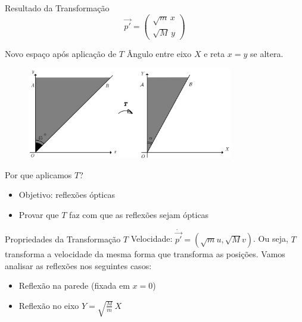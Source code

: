 \documentclass{beamer}
\begin{document}
\begin{frame}{Resultado da Transformação}
  \begin{equation*}
    \vec{p'}=\begin{pmatrix}\sqrt m\,x\\\sqrt M\,y\end{pmatrix}
  \end{equation*}
\end{frame}

\begin{frame}{Novo espaço após aplicação de $T$}
  Ângulo entre eixo $X$ e reta $x=y$ se altera.
  \begin{figure}
    \centering
    \includegraphics[width=0.8\textwidth]{images/image-3.png}
  \end{figure}
\end{frame}

\begin{frame}{Por que aplicamos $T$?}
  \begin{itemize}
    \item Objetivo: reflexões ópticas
    \item Provar que $T$ faz com que as reflexões sejam ópticas
  \end{itemize}
\end{frame}

\begin{frame}{Propriedades da Transformação $T$}
  Velocidade: ${\dot{\vec{p'}}}=(\sqrt{m}u,\sqrt{M}v)$. Ou seja, $T$ transforma a velocidade da mesma
  forma que transforma as posições.
  Vamos analisar as reflexões nos seguintes casos:
  \begin{itemize}
    \item Reflexão na parede (fixada em $x=0$)
    \item Reflexão no eixo $Y=\sqrt{\frac{M}{m}}\,X$
  \end{itemize}
\end{frame}
\end{document}
